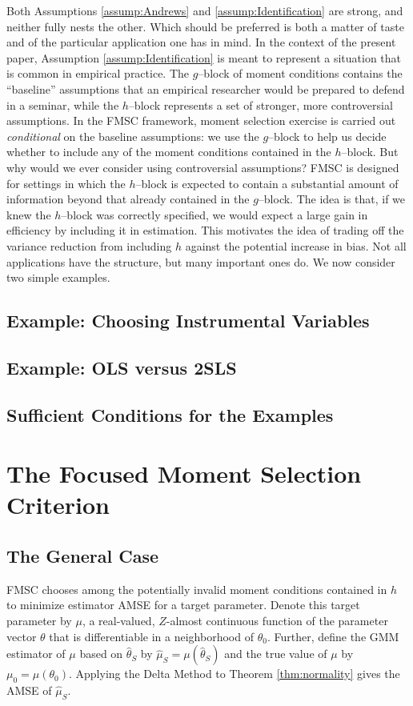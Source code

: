\documentclass[12pt]{article}
\theoremstyle{definition}
\begin{document}
Both Assumptions \ref{assump:Andrews} and \ref{assump:Identification} are strong, and neither fully nests the other. Which should be preferred is both a matter of taste and of the particular application one has in mind. In the context of the present paper, Assumption \ref{assump:Identification} is meant to represent a situation that is common in empirical practice. The $g$--block of moment conditions contains the ``baseline'' assumptions that an empirical researcher would be prepared to defend in a seminar, while the $h$--block represents a set of stronger, more controversial assumptions. In the FMSC framework, moment selection exercise is carried out \emph{conditional} on the baseline assumptions: we use the $g$--block to help us decide whether to include any of the moment conditions contained in the $h$--block. But why would we ever consider using controversial assumptions? FMSC is designed for settings in which the $h$--block is expected to contain a substantial amount of information beyond that already contained in the $g$--block. The idea is that, if we knew the $h$--block was correctly specified, we would expect a large gain in efficiency by including it in estimation. This motivates the idea of trading off the variance reduction from including $h$ against the potential increase in bias. Not all applications have the structure, but many important ones do. We now consider two simple examples. 


\subsection{Example: Choosing Instrumental Variables}

\subsection{Example: OLS versus 2SLS}

\subsection{Sufficient Conditions for the Examples}
\label{sec:sufficient}


\section{The Focused Moment Selection Criterion}
\label{sec:FMSC}

\subsection{The General Case}
FMSC chooses among the potentially invalid moment conditions contained in $h$ to minimize estimator AMSE for a target parameter. Denote this target parameter by $\mu$, a real-valued, $Z$-almost continuous function of the parameter vector $\theta$ that is differentiable in a neighborhood of $\theta_0$. Further, define the GMM estimator of $\mu$ based on $\widehat{\theta}_S$ by $\widehat{\mu}_S = \mu(\widehat{\theta}_S)$ and the true value of $\mu$ by $\mu_0 = \mu(\theta_0)$. Applying the Delta Method to Theorem \ref{thm:normality} gives the AMSE of $\widehat{\mu}_S$.
\end{document}
